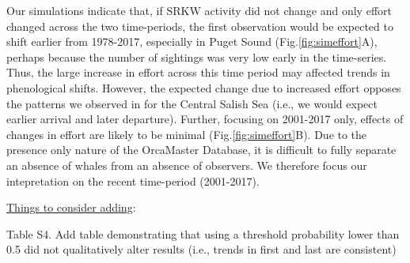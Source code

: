 \documentclass{article}
\begin{document}
\par Our simulations indicate that, if SRKW activity did not change and only effort changed across the two time-periods, the first observation would be expected to shift earlier from 1978-2017, especially in Puget Sound (Fig.\ref{fig:simeffort}A), perhaps because the number of sightings was very low early in the time-series. Thus, the large increase in effort across this time period may affected trends in phenological shifts.  However, the expected change due to increased effort opposes the patterns we observed in for the Central Salish Sea (i.e., we would expect earlier arrival and later departure). Further, focusing on 2001-2017 only, effects of changes in effort are likely to be minimal (Fig.\ref{fig:simeffort}B). Due to the presence only nature of the OrcaMaster Database, it is difficult to fully separate an absence of whales from an absence of observers. We therefore focus our intepretation on the recent time-period (2001-2017).

\par \underline{Things to consider adding}:

\par Table S4. Add table demonstrating that using a threshold probability lower than 0.5 did not qualitatively alter results (i.e., trends in first and last are consistent)

\end{document}
